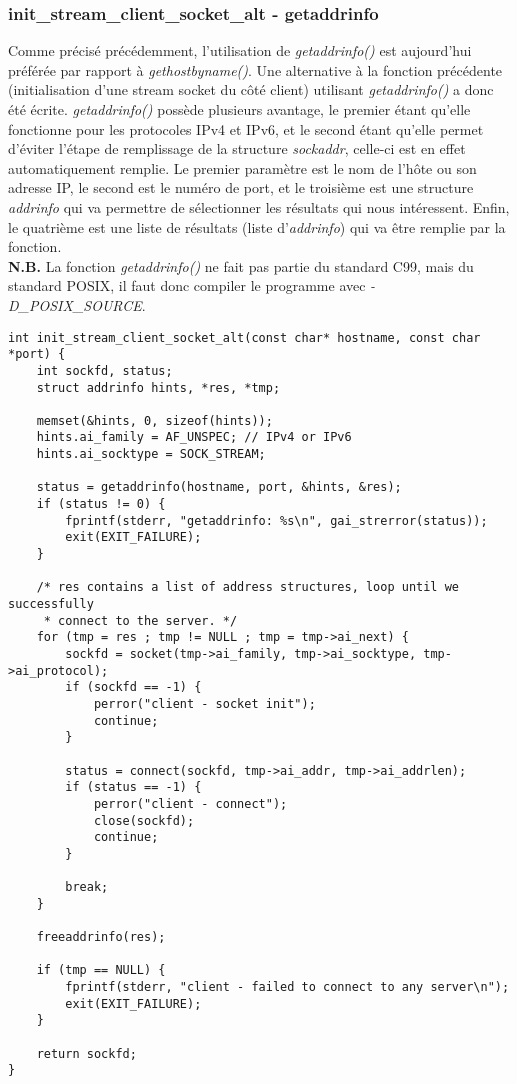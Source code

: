 \documentclass[a4paper, frenchb, 11pt]{article}
\begin{document}
\subsubsection{init\_stream\_client\_socket\_alt - getaddrinfo}
Comme précisé précédemment, l'utilisation de \emph{getaddrinfo()} est aujourd'hui préférée par rapport à \emph{gethostbyname()}. Une alternative à la fonction précédente (initialisation d'une stream socket du côté client) utilisant \emph{getaddrinfo()} a donc été écrite. \emph{getaddrinfo()} possède plusieurs avantage, le premier étant qu'elle fonctionne pour les protocoles IPv4 et IPv6, et le second étant qu'elle permet d'éviter l'étape de remplissage de la structure \emph{sockaddr}, celle-ci est en effet automatiquement remplie. Le premier paramètre est le nom de l'hôte ou son adresse IP, le second est le numéro de port, et le troisième est une structure \emph{addrinfo} qui va permettre de sélectionner les résultats qui nous intéressent. Enfin, le quatrième est une liste de résultats (liste d'\emph{addrinfo}) qui va être remplie par la fonction.\\

\noindent \textbf{N.B.} La fonction \emph{getaddrinfo()} ne fait pas partie du standard C99, mais du standard POSIX, il faut donc compiler le programme avec \emph{-D\_POSIX\_SOURCE}.\\

\begin{lstlisting}
int init_stream_client_socket_alt(const char* hostname, const char *port) {
    int sockfd, status;
    struct addrinfo hints, *res, *tmp;

    memset(&hints, 0, sizeof(hints));
    hints.ai_family = AF_UNSPEC; // IPv4 or IPv6
    hints.ai_socktype = SOCK_STREAM;

    status = getaddrinfo(hostname, port, &hints, &res);
    if (status != 0) {
        fprintf(stderr, "getaddrinfo: %s\n", gai_strerror(status));
        exit(EXIT_FAILURE);
    }

    /* res contains a list of address structures, loop until we successfully
     * connect to the server. */
    for (tmp = res ; tmp != NULL ; tmp = tmp->ai_next) {
        sockfd = socket(tmp->ai_family, tmp->ai_socktype, tmp->ai_protocol);
        if (sockfd == -1) {
            perror("client - socket init");
            continue;
        }

        status = connect(sockfd, tmp->ai_addr, tmp->ai_addrlen);
        if (status == -1) {
            perror("client - connect");
            close(sockfd);
            continue;
        }

        break;
    }

    freeaddrinfo(res);

    if (tmp == NULL) {
        fprintf(stderr, "client - failed to connect to any server\n");
        exit(EXIT_FAILURE);
    }

    return sockfd;
}
\end{lstlisting}
\end{document}
